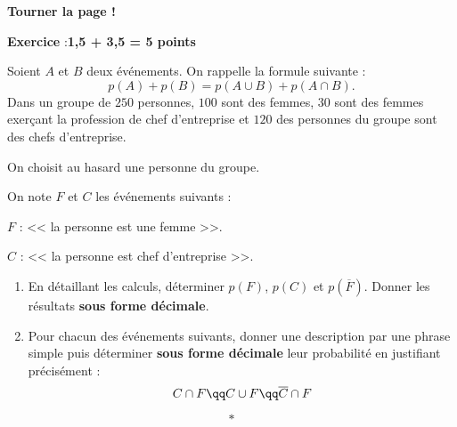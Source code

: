 \documentclass[10pt,french]{book}
\newcounter{exoc}
\newenvironment{exoc}[1]{%
  \refstepcounter{exoc}\textbf{Exercice \theexoc} :\hfill {\textbf{#1}}\par
  \medskip}%
{\medskip}
\begin{document}
\vfill

\begin{center}
    \bfseries Tourner la page !
\end{center}\clearpage

\begin{exoc}{1,5 + 3,5 = 5 points}
    Soient $A$ et $B$ deux événements. On rappelle la formule suivante :
    \[p(A) + p(B) = p(A \cup B) + p(A \cap B).\]
    Dans un groupe de $250$ personnes, $100$ sont des femmes, $30$ sont des femmes exerçant la profession de chef d'entreprise et $120$ des personnes du groupe sont des chefs d'entreprise.\par
    On choisit au hasard une personne du groupe.\par
    On note $F$ et $C$ les événements suivants :\par
    $F$ : << la personne est une femme >>.\par
    $C$ : << la personne est chef d'entreprise >>.
    \begin{enumerate}
        \item En détaillant les calculs, déterminer $p(F)$, $p(C)$ et $p\left(\overline F\right)$. Donner les résultats \textbf{sous forme décimale}.
        \item Pour chacun des événements suivants, donner une description par une phrase simple puis déterminer \textbf{sous forme décimale} leur probabilité en justifiant précisément :
            \[C \cap F \qq C \cup F \qq \overline C \cap F \]
    \end{enumerate}
\end{exoc}\[*\]
\end{document}
